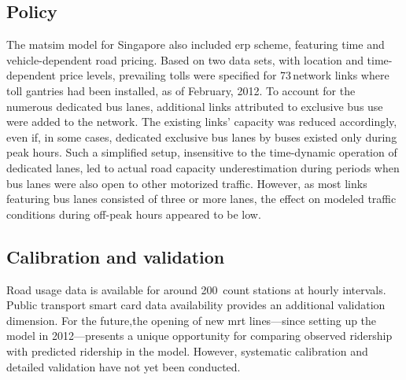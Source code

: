\subsection{Policy}
The \gls{matsim} model for Singapore also included \gls{erp} scheme, featuring time and vehicle-dependent road pricing. Based on two data sets, with location and time-dependent price levels, prevailing tolls were specified for 73\,network links where toll gantries had been installed, as of February, 2012. To account for the numerous dedicated bus lanes, additional links attributed to exclusive bus use were added to the network. The existing links' capacity was reduced accordingly, even if, in some cases, dedicated exclusive bus lanes by buses existed only during peak hours. Such a simplified setup, insensitive to the time-dynamic operation of dedicated lanes, led to actual road capacity underestimation during periods when bus lanes were also open to other motorized traffic. However, as most links featuring bus lanes consisted of three or more lanes, the effect on modeled traffic conditions during off-peak hours appeared to be low.

\subsection{Calibration and validation}
Road usage data is available for around 200\, 
count stations at hourly intervals. Public transport smart card data availability provides an additional validation dimension. For the future,the opening of new \gls{mrt} lines---since setting up the model in 2012---presents a unique opportunity for comparing observed ridership with predicted ridership in the model. However, systematic calibration and detailed validation have not yet been conducted.

